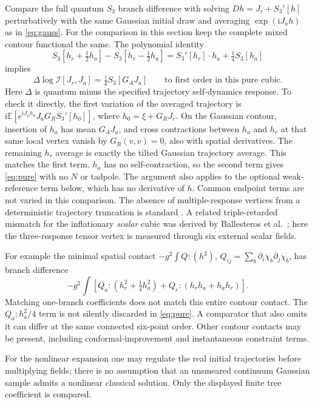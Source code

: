 \documentclass[11pt]{article}
\newcommand{\ii}{\mathrm{i}}
\newcommand{\I}{\mathcal I}
\begin{document}
Compare the full quantum \(S_3\) branch difference with solving \(D h=J_r+S_3'[h]\) perturbatively with the same Gaussian initial draw and averaging \(\exp(\ii J_a h)\) as in \eqref{eq:gauss}. For the comparison in this section keep the complete mixed contour functional the same. The polynomial identity
\[
 S_3[h_r+\tfrac12 h_a]-S_3[h_r-\tfrac12 h_a]
 = S_3'[h_r]\cdot h_a+\tfrac14 S_3[h_a]
\]
implies
\begin{equation}
 \Delta \log \I[J_r,J_a]=\tfrac{\ii}{4} S_3[G_AJ_a]
 \qquad\text{to first order in this pure cubic.}
 \label{eq:pure}
\end{equation}
Here \(\Delta\) is quantum minus the specified trajectory self-dynamics response. To check it directly, the first variation of the averaged trajectory is
\(\ii\mathbb E[e^{\ii J_a h_0}J_aG_R S_3'[h_0]]\),
where \(h_0=\xi+G_RJ_r\). On the Gaussian contour, insertion of \(h_a\) has mean \(G_AJ_a\), and cross contractions between \(h_a\) and \(h_r\) at that same local vertex vanish by \(G_R(v,v)=0\), also with spatial derivatives. The remaining \(h_r\) average is exactly the tilted Gaussian trajectory average. This matches the first term. \(h_a\) has no self-contraction, so the second term gives \eqref{eq:pure} with no \(N\) or tadpole. The argument also applies to the optional weak-reference term below, which has no derivative of \(h\). Common endpoint terms are not varied in this comparison. The absence of multiple-response vertices from a deterministic trajectory truncation is standard \cite{Polkovnikov}. A related triple-retarded mismatch for the inflationary \emph{scalar} cubic was derived by Ballesteros et al.\ \cite[Eq.~(10)]{Ballesteros}; here the three-response tensor vertex is measured through six external scalar fields.

For example the minimal spatial contact \(-g^2\int Q:(h^2)\), \(Q_{ij}=\sum_b\partial_i\chi_b\partial_j\chi_b\), has branch difference
\[
 -g^2\int
 \left[Q_a:(h_r^2+\tfrac14 h_a^2)
       +Q_r:(h_rh_a+h_ah_r)\right].
\]
Matching one-branch coefficients does not match this entire contour contact. The \(Q_a:h_a^2/4\) term is not silently discarded in \eqref{eq:pure}. A comparator that also omits it can differ at the same connected six-point order. Other contour contacts may be present, including conformal-improvement and instantaneous constraint terms.

For the nonlinear expansion one may regulate the real initial trajectories before multiplying fields; there is no assumption that an unsmeared continuum Gaussian sample admits a nonlinear classical solution. Only the displayed finite tree coefficient is compared.
\end{document}
